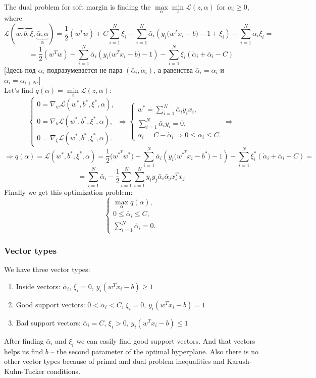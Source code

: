The dual problem for soft margin is finding the $\max\limits_{\alpha}\min\limits_{z}\mathcal{L}(z,\alpha)$ for $\alpha_i\ge0$, where
$$\mathcal{L}(\overbrace{w,b,\xi}^{z},\underbrace{\bar\alpha,\dot\alpha}_{\alpha})=\frac{1}{2}(w^Tw)+C\sum\limits_{i=1}^{N}\xi_i-\sum\limits_{i=1}^{N}\bar\alpha_i(y_i\big(w^Tx_i-b\big)-1+\xi_i)-\sum\limits_{i=1}^{N}\dot\alpha_i\xi_i=$$
$$=\frac{1}{2}(w^Tw)-\sum\limits_{i=1}^{N}\bar\alpha_i(y_i\big(w^Tx_i-b\big)-1)-\sum\limits_{i=1}^{N}\xi_i(\dot\alpha_i+\bar\alpha_i-C)$$
[Здесь под $\alpha_i$ подразумевается не пара $(\bar\alpha_i,\dot\alpha_i)$, а равенства $\bar\alpha_i = \alpha_i$ и $\dot\alpha_i=\alpha_{i+N}$.]\\
Let's find $q(\alpha)=\min\limits_{z}\mathcal{L}(z,\alpha)$:
$$\begin{cases}
	0=\nabla_w\mathcal{L}(w^*,b^*,\xi^*,\alpha), \\
	0=\nabla_b\mathcal{L}(w^*,b^*,\xi^*,\alpha), \\
	0=\nabla_\xi\mathcal{L}(w^*,b^*,\xi^*,\alpha).
\end{cases}\Longrightarrow
\begin{cases}
	w^*=\sum\limits_{i=1}^{N}\bar\alpha_iy_ix_i, \\
	\sum\limits_{i=1}^{N}\bar\alpha_iy_i=0, \\
	\bar\alpha_i=C-\dot\alpha_i\Rightarrow 0\le\bar\alpha_i\le C.
\end{cases}\Longrightarrow$$
$$\Longrightarrow q(\alpha)=\mathcal{L}(w^*,b^*,\xi^*,\alpha)=\frac{1}{2}\big(w^{*^T}w^*\big)-\sum\limits_{i=1}^{N}\bar\alpha_i(y_i\big(w^{*^T}x_i-b^*\big)-1)-\sum\limits_{i=1}^{N}\xi_i^*(\dot\alpha_i+\bar\alpha_i-C)=$$
$$=\sum\limits_{i=1}^{N}\bar\alpha_i-\frac{1}{2}\sum\limits_{i=1}^{N}\sum\limits_{i=1}^{N}y_iy_j\bar\alpha_i\bar\alpha_jx_i^Tx_j$$
Finally we get this optimization problem:
$$\begin{cases}
	\max_{\alpha}q(\alpha), \\
	0\le\bar\alpha_i\le C, \\
	\sum\limits_{i=1}^{N}\bar\alpha_i=0.
\end{cases}$$

\subsubsection*{Vector types}

We have three vector types:
\begin{enumerate}[label=\arabic*.]
	\item Inside vectors: $\bar\alpha_i$, $\xi_i=0$, $y_i(w^Tx_i-b)\ge1$
	\item Good support vectors: $0<\bar\alpha_i<C$, $\xi_i=0$, $y_i(w^Tx_i-b)=1$
	\item Bad support vectors: $\bar\alpha_i=C$, $\xi_i>0$, $y_i(w^Tx_i-b)\le1$
\end{enumerate}
After finding $\bar\alpha_i$ and $\xi_i$ we can easily find good support vectors. And that vectors helps us find $b$ -- the second parameter of the optimal hyperplane. Also there is no other vector types because of primal and dual problem inequalities and Karush-Kuhn-Tucker conditions.

